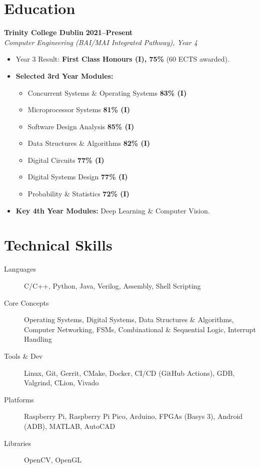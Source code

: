 \documentclass[10pt,a4paper]{article}
\begin{document}
\section*{Education}
\textbf{Trinity College Dublin} \hfill \textbf{2021--Present} \\
\textit{Computer Engineering (BAI/MAI Integrated Pathway), Year 4}
\begin{itemize}
    \item Year 3 Result: \textbf{First Class Honours (I), 75\%} (60 ECTS awarded).
    \item \textbf{Selected 3rd Year Modules:}
    \begin{itemize}[label={}, leftmargin=1em]
        \item Concurrent Systems \& Operating Systems \hfill \textbf{83\% (I)}
        \item Microprocessor Systems \hfill \textbf{81\% (I)}
        \item Software Design Analysis \hfill \textbf{85\% (I)}
        \item Data Structures \& Algorithms \hfill \textbf{82\% (I)}
        \item Digital Circuits \hfill \textbf{77\% (I)}
        \item Digital Systems Design \hfill \textbf{77\% (I)}
        \item Probability \& Statistics \hfill \textbf{72\% (I)}
    \end{itemize}
    \item \textbf{Key 4th Year Modules:} Deep Learning & Computer Vision.
\end{itemize}


\section*{Technical Skills}
\begin{description}
    \item[Languages] C/C++, Python, Java, Verilog, Assembly, Shell Scripting
    \item[Core Concepts] Operating Systems, Digital Systems, Data Structures \& Algorithms, Computer Networking, FSMs, Combinational \& Sequential Logic, Interrupt Handling
    \item[Tools \& Dev] Linux, Git, Gerrit, CMake, Docker, CI/CD (GitHub Actions), GDB, Valgrind, CLion, Vivado
    \item[Platforms] Raspberry Pi, Raspberry Pi Pico, Arduino, FPGAs (Basys 3), Android (ADB), MATLAB, AutoCAD
    \item[Libraries] OpenCV, OpenGL
\end{description}
\end{document}
